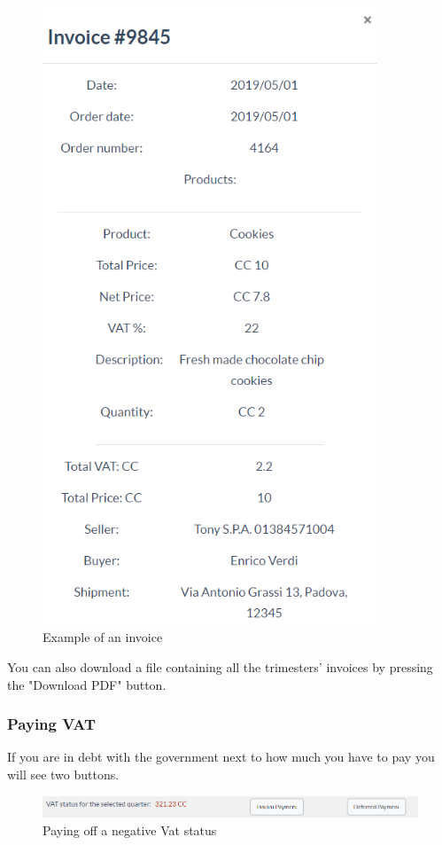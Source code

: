 	\begin{figure}[H]
		\includegraphics[width=10cm]{res/images/invoice_details.png}
		\centering
		\caption{Example of an invoice}
	\end{figure}
	\noindent You can also download a file containing all the trimesters'
	invoices by pressing the "Download PDF" button. 
	\subsubsection{Paying VAT}
	If you are in debt with the government next to how much you have to pay 
	you will see two buttons.
	\begin{figure}[H]
		\includegraphics[width=15cm]{res/images/paying_vat.png}
		\centering
		\caption{Paying off a negative Vat status}
	\end{figure}

